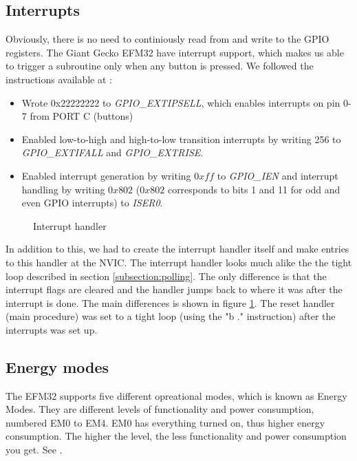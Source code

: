 	\subsection{Interrupts}
	\label{subsection:interrupts}
	Obviously, there is no need to continiously read from and write to the GPIO registers. The Giant Gecko EFM32 have interrupt support, which makes us able to trigger a subroutine only when any button is pressed. We followed the instructions available at \cite[p. 24]{compendium}:
	\begin{itemize}
		\item Wrote 0x22222222 to \emph{GPIO\_EXTIPSELL}, which enables interrupts on pin 0-7 from PORT C (buttons) \cite[p. 770]{reference_manual}
		\item Enabled low-to-high and high-to-low transition interrupts by writing 256 to \emph{GPIO\_EXTIFALL} and \emph{GPIO\_EXTRISE}.
		\item Enabled interrupt generation by writing $0xff$ to \emph{GPIO\_IEN} and interrupt handling by writing $0x802$ ($0x802$ corresponds to bits 1 and 11 for odd and even GPIO interrupts) to \emph{ISER0}.
	\end{itemize}
	
	\begin{figure}[h]
		
		\caption{Interrupt handler}
		\label{code:interrupt_handler}
	\end{figure}


In addition to this, we had to create the interrupt handler itself and make entries to this handler at the NVIC. The interrupt handler looks much alike the the tight loop described in section \ref{subsection:polling}. The only difference is that the interrupt flags are cleared and the handler jumps back to where it was after the interrupt is done. The main differences is shown in figure \ref{code:interrupt_handler}. The reset handler (main procedure) was set to a tight loop (using the "b ." instruction) after the interrupts was set up.

	\subsection{Energy modes}
	The EFM32 supports five different opreational modes, which is known as Energy Modes. They are different levels of functionality and power consumption, numbered EM0 to EM4. EM0 has everything turned on, thus higher energy consumption. The higher the level, the less functionality and power consumption you get. See \cite[p. 2]{energy_optimization_application_note}.

